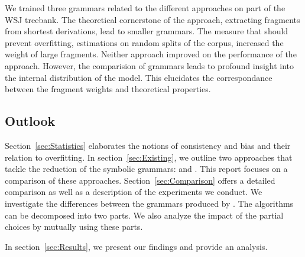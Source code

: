 We trained three grammars related to the different approaches on part of the WSJ treebank. The theoretical cornerstone of the \dops{} approach, extracting fragments from shortest derivations, lead to smaller grammars. The measure that should prevent overfitting, estimations on random splits of the corpus, increased the weight of large fragments. Neither approach improved on the performance of the \ddop{} approach. However, the comparision of grammars leads to profound insight into the internal distribution of the model. This elucidates the correspondance between the fragment weights and theoretical properties.

\subsection{Outlook}
Section~\ref{sec:Statistics} elaborates the notions of consistency and bias and their relation to overfitting.
In section~\ref{sec:Existing}, we outline two approaches that tackle the reduction of the symbolic grammars: \ddop{} and \dops{}. This report focuses on a comparison of these approaches. Section~\ref{sec:Comparison} offers a detailed comparison as well as a description of the experiments we conduct. 
We investigate the differences between the grammars produced by \ddop{} \dops{}. The algorithms can be decomposed into two parts. We also analyze the impact of the partial choices by mutually using these parts.

In section~\ref{sec:Results}, we present our findings and provide an analysis. 


